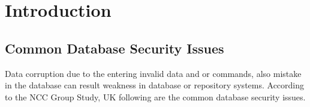 \documentclass[12pt]{book} %
\begin{document}







{}












\setcounter{page}{1}





\section*{Introduction}


\subsection*{Common Database Security Issues}


Data corruption due to the entering invalid data and or commands, also mistake in the database can result weakness in database or repository systems. According to the NCC Group Study, UK following are the common
database security issues.\cite{db_security_an_overview_and_analysis_of_current_trend} \label{sec:db_security_an_overview_and_analysis_of_current_trend_1}\\
\end{document}
